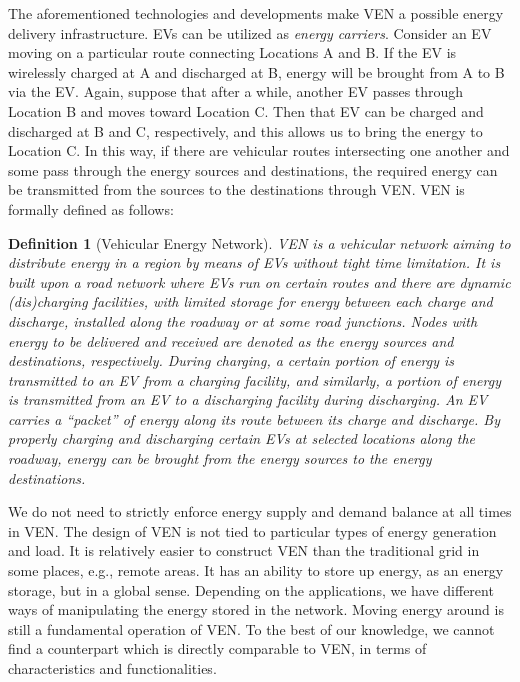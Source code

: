 \documentclass[journal]{IEEEtran}
\newtheorem{definition}{Definition}
\begin{document}
The aforementioned technologies and developments make VEN a possible energy delivery infrastructure. 
EVs can be utilized  as \textit{energy carriers}. Consider an EV moving on a particular route connecting Locations A and B. If the EV is wirelessly charged at A and discharged at B, energy will be brought from A to B via the EV. Again, suppose that after a while, another EV passes through Location B and moves toward Location C. Then that EV can be charged and discharged at B and C, respectively, and this allows us to bring the energy to Location C. In this way,  if there are vehicular routes intersecting one another and some pass through the energy sources and destinations, the required energy can be transmitted from the sources to the destinations through VEN. VEN is formally defined as follows:

\begin{definition}[Vehicular Energy Network]
VEN is a vehicular network aiming to distribute energy in a region by means of EVs without tight time limitation. 
It is built upon a road network where EVs run on certain routes and there are dynamic (dis)charging facilities, with limited storage for  energy between each charge and discharge, installed along the roadway or at some road junctions. Nodes with energy to be delivered and received are denoted as the energy sources and destinations, respectively. During charging, a certain portion of energy is transmitted to an EV from a charging facility, and similarly, a portion of energy is transmitted from an EV  to a discharging facility during discharging. An EV carries a \textit{``packet'' of energy} along its route between its charge and discharge. By properly charging and discharging certain EVs at selected locations along the roadway, energy can be brought from the energy sources to the energy destinations.
\end{definition}

We do not need to strictly enforce energy supply and demand balance at all times in VEN. The design of VEN is not tied to particular types of energy generation and load. It is relatively easier to construct VEN than the traditional grid in some places, e.g., remote areas. It has an ability to store up energy, as an energy storage, but in a global sense. Depending on the applications, we have different ways of manipulating the energy stored in the network. Moving energy around is still a fundamental operation of VEN. To the best of our knowledge, we cannot find a counterpart which is directly comparable to VEN, in terms of characteristics and functionalities. 
\end{document}
